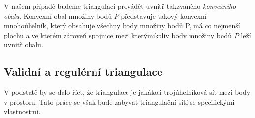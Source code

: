 \documentclass[12pt,a4paper]{article}
\begin{document}
V našem případě budeme triangulaci provádět uvnitř takzvaného \emph{konvexního obalu}. Konvexní obal množiny bodů $P$ představuje takový konvexní mnohoúhelník, který obsahuje všechny body množiny bodů P, má co nejmenší plochu a ve kterém zároveň spojnice mezi kterýmikoliv body množiny bodů $P$ leží uvnitř obalu.

\newpage
\begin{figure}[h!]
\centering
\begin{floatrow}
\end{floatrow}
\end{figure}

\newpage
\subsection{Validní a regulérní triangulace}
V podstatě by se dalo říct, že triangulace je jakákoli trojúhelníková síť mezi body v prostoru. Tato práce se však bude zabývat triangulační sítí se specifickými vlastnostmi.
\end{document}
